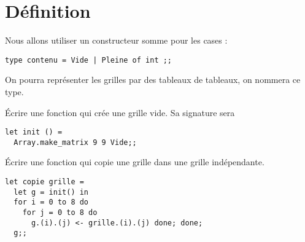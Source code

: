\section{Définition} 
Nous allons utiliser un constructeur somme pour les cases :
\begin{lstlisting}
type contenu = Vide | Pleine of int ;;
\end{lstlisting} 
On pourra représenter les grilles par des tableaux de tableaux, on nommera  ce type.
\begin{Exercise}
{\'Ecrire une fonction qui crée une grille vide. Sa signature sera  
}
\end{Exercise}
\begin{Answer}
\begin{lstlisting}
let init () =
  Array.make_matrix 9 9 Vide;;
\end{lstlisting} 
\end{Answer}
\begin{Exercise}
{\'Ecrire une fonction qui copie une grille dans une grille indépendante.
}
\end{Exercise}
\begin{Answer}
\begin{lstlisting}
let copie grille =
  let g = init() in
  for i = 0 to 8 do
    for j = 0 to 8 do
      g.(i).(j) <- grille.(i).(j) done; done;
  g;;
\end{lstlisting} 
\end{Answer}
